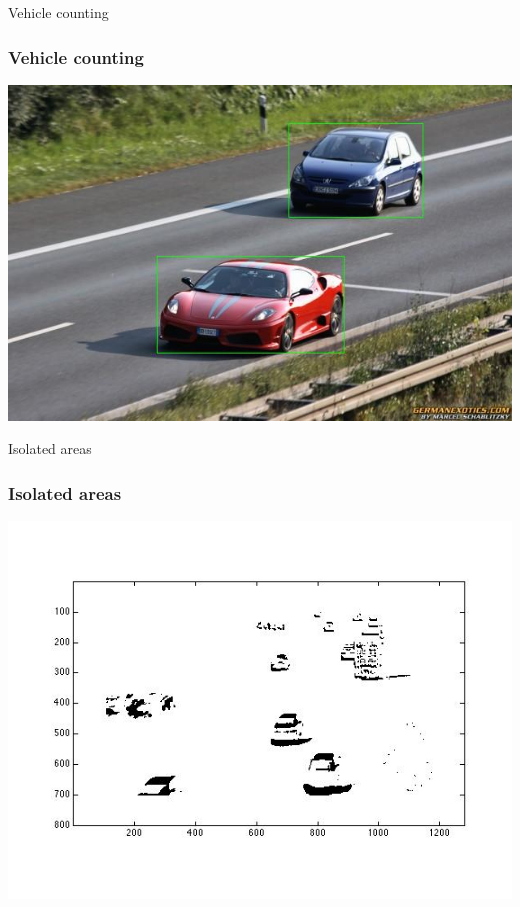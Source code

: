 \documentclass{beamer}
\begin{document}
\begin{frame}{Vehicle counting}
	\frametitle{Vehicle counting}
	\begin{center}
		\includegraphics[width= 0.8\linewidth]{images/cars.jpg}  
	\end{center}
\end{frame}



\begin{frame}{Isolated areas}
	\frametitle{Isolated areas}
	\begin{center}
		\includegraphics[width= 0.8\linewidth]{images/isolated_areas.jpg}  
	\end{center}
\end{frame}
\end{document}
